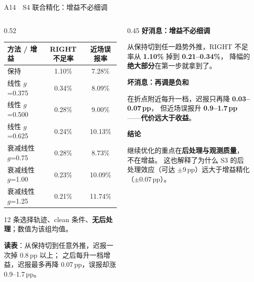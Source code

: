 \documentclass[aspectratio=169,10pt]{ctexbeamer}
\begin{document}
\begin{frame}{A14\ \ S4 联合精化：增益不必细调}
  \vspace{-0.4em}
  \begin{columns}[T]
    \begin{column}{0.52\textwidth}
      \footnotesize
      \renewcommand{\arraystretch}{1.30}
      \begin{tabular}{@{}lcc@{}}
        \toprule
        \textbf{方法 / 增益} & \textbf{RIGHT 不足率} & \textbf{近场误报率} \\
        \midrule
        保持 & 1.10\% & 7.28\% \\
        \midrule
        线性 $g$=0.375 & 0.34\% & 8.09\% \\
        线性 $g$=0.500 & 0.28\% & 9.00\% \\
        线性 $g$=0.625 & 0.24\% & 10.13\% \\
        \midrule
        衰减线性 $g$=0.75 & 0.28\% & 8.73\% \\
        衰减线性 $g$=1.00 & 0.23\% & 10.09\% \\
        衰减线性 $g$=1.25 & 0.21\% & 11.74\% \\
        \bottomrule
      \end{tabular}

      \vspace{0.8em}
      {\scriptsize\color{black!62}12 条选择轨迹、clean 条件、\textbf{无后处理}；数值为该组均值。}

      \vspace{1.0em}
      {\scriptsize\color{black!70}%
      \textbf{读表}：从保持切到任意外推，迟报一次掉 0.8\,pp 以上；
      之后每升一档增益，迟报最多再降 0.07\,pp，误报却涨 0.9--1.7\,pp。}
    \end{column}
    \begin{column}{0.45\textwidth}
      \footnotesize
      \textbf{好消息：增益不必细调}\par
      从保持切到任一趋势外推，RIGHT 不足率从 \textbf{1.10\%} 掉到 \textbf{0.21--0.34\%}，
      降幅的\textbf{绝大部分}在第一步就拿到了。

      \vspace{1.0em}
      \textbf{坏消息：再调是负和}\par
      在折点附近每升一档，迟报只再降 \textbf{0.03--0.07\,pp}，
      但近场误报升 \textbf{0.9--1.7\,pp}——\textbf{代价远大于收益}。

      \vspace{1.0em}
      \textbf{结论}\par
      继续优化的重点在\textbf{后处理与观测质量}，不在增益。
      这也解释了为什么 S3 的后处理效应（可达 $\pm$9\,pp）远大于增益精化（$\pm$0.07\,pp）。
    \end{column}
  \end{columns}
\end{frame}
\end{document}
